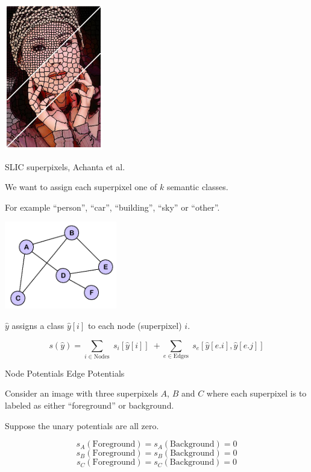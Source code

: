 {
\centerline{\includegraphics[height = 2.5in]{../images/SLICcolor}}
\centerline{\huge SLIC superpixels, Achanta et al.}

\vfill
We want to assign each superpixel one of $k$ semantic classes.

\vfill
For example ``person'', ``car'', ``building'', ``sky'' or ``other''.



\centerline{\includegraphics[height= 1.5in]{../images/Graph}}

$\hat{y} $ assigns a class $\hat{y}[i]$ to each node (superpixel) $i$.


$$s(\hat{y}) = \sum_{i \in \mathrm{Nodes}}\; s_i[\hat{y}[i]]\; + \sum_{e \in \mathrm{Edges}}\;s_e[\hat{y}[e.i],\hat{y}[e.j]]$$

\vfill
\centerline{Node Potentials \hspace{4em}Edge Potentials}


Consider an image with three superpixels $A$, $B$ and $C$ where
each superpixel is to labeled as either ``foreground'' or background.

\vfill
Suppose the unary potentials are all zero.

\vfill
$$s_A(\mathrm{Foreground}) = s_A(\mathrm{Background}) = 0$$
$$s_B(\mathrm{Foreground}) = s_B(\mathrm{Background}) = 0$$
$$s_C(\mathrm{Foreground}) = s_C(\mathrm{Background}) = 0$$

}
